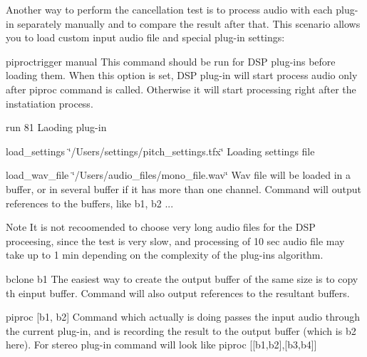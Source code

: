Another way to perform the cancellation test is to process audio with each plug-\/in separately manually and to compare the result after that. This scenario allows you to load custom input audio file and special plug-\/in settings\+: 
\begin{DoxyEnumerate}
\item {\ttfamily piproctrigger manual} This command should be run for D\+SP plug-\/ins before loading them. When this option is set, D\+SP plug-\/in will start process audio only after piproc command is called. Otherwise it will start processing right after the instatiation process. ~\newline
  
\item {\ttfamily run 81} Laoding plug-\/in ~\newline
  
\item {\ttfamily load\+\_\+settings \char`\"{}/\+Users/settings/pitch\+\_\+settings.\+tfx\char`\"{}} Loading settings file ~\newline
  
\item {\ttfamily load\+\_\+wav\+\_\+file \char`\"{}/\+Users/audio\+\_\+files/mono\+\_\+file.\+wav\char`\"{}} Wav file will be loaded in a buffer, or in several buffer if it has more than one channel. Command will output references to the buffers, like b1, b2 ... \begin{DoxyNote}{Note}
It is not recoomended to choose very long audio files for the D\+SP proceesing, since the test is very slow, and processing of 10 sec audio file may take up to 1 min depending on the complexity of the plug-\/in\textquotesingle{}s algorithm. ~\newline
  
\end{DoxyNote}

\item {\ttfamily bclone b1} The easiest way to create the output buffer of the same size is to copy th einput buffer. Command will also output references to the resultant buffers. ~\newline
  
\item {\ttfamily piproc \mbox{[}b1, b2\mbox{]}} Command which actually is doing passes the input audio through the current plug-\/in, and is recording the result to the output buffer (which is b2 here). For stereo plug-\/in command will look like piproc {\ttfamily \mbox{[}\mbox{[}b1,b2\mbox{]},\mbox{[}b3,b4\mbox{]}\mbox{]}} ~\newline
  

\end{DoxyEnumerate}
